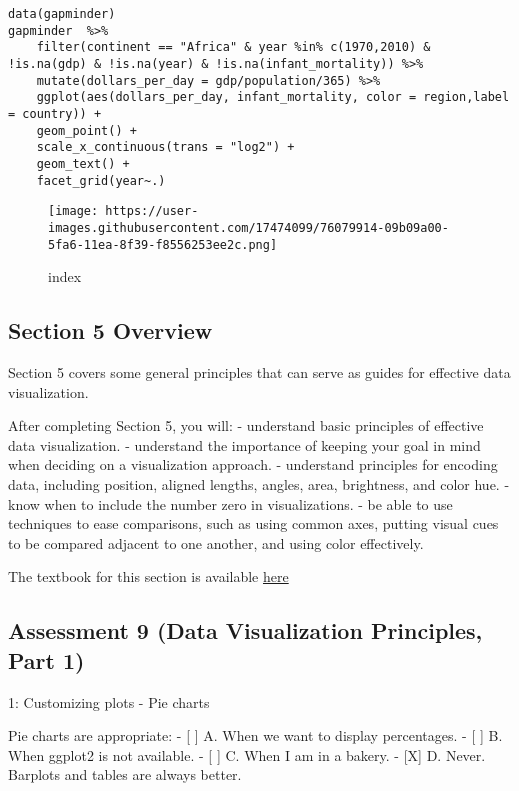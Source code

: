 \documentclass[]{article}
\begin{document}
\begin{verbatim}
data(gapminder)
gapminder  %>%
    filter(continent == "Africa" & year %in% c(1970,2010) & !is.na(gdp) & !is.na(year) & !is.na(infant_mortality)) %>%
    mutate(dollars_per_day = gdp/population/365) %>%
    ggplot(aes(dollars_per_day, infant_mortality, color = region,label = country)) +
    geom_point() +
    scale_x_continuous(trans = "log2") +
    geom_text() +
    facet_grid(year~.)
\end{verbatim}

\begin{figure}
\centering
\texttt{[image: https://user-images.githubusercontent.com/17474099/76079914-09b09a00-5fa6-11ea-8f39-f8556253ee2c.png]}
\caption{index}
\end{figure}

\hypertarget{section-5-overview}{%
\subsection{Section 5 Overview}\label{section-5-overview}}

Section 5 covers some general principles that can serve as guides for
effective data visualization.

After completing Section 5, you will: - understand basic principles of
effective data visualization. - understand the importance of keeping
your goal in mind when deciding on a visualization approach. -
understand principles for encoding data, including position, aligned
lengths, angles, area, brightness, and color hue. - know when to include
the number zero in visualizations. - be able to use techniques to ease
comparisons, such as using common axes, putting visual cues to be
compared adjacent to one another, and using color effectively.

The textbook for this section is available
\href{https://rafalab.github.io/dsbook/data-visualization-principles.html}{here}

\hypertarget{assessment-9-data-visualization-principles-part-1}{%
\subsection{Assessment 9 (Data Visualization Principles, Part
1)}\label{assessment-9-data-visualization-principles-part-1}}

1: Customizing plots - Pie charts

Pie charts are appropriate: - {[} {]} A. When we want to display
percentages. - {[} {]} B. When ggplot2 is not available. - {[} {]} C.
When I am in a bakery. - {[}X{]} D. Never. Barplots and tables are
always better.
\end{document}
